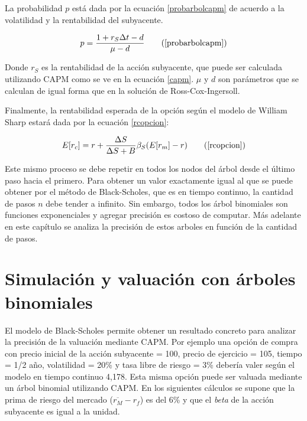 La probabilidad $p$ está dada por la ecuación \eqref{probarbolcapm} de acuerdo a la volatilidad y la rentabilidad del subyacente.

\begin{equation}
	p = \frac{1 + r_S \Delta t - d}{\mu - d} \tag{\ref{probarbolcapm}}
\end{equation}

Donde $r_S$ es la rentabilidad de la acción subyacente, que puede ser calculada utilizando CAPM como se ve en la ecuación \eqref{capm}. $\mu$ y $d$ son parámetros que se calculan de igual forma que en la solución de Ross-Cox-Ingersoll. 

Finalmente, la rentabilidad esperada de la opción según el modelo de William Sharp estará dada por la ecuación \eqref{rcopcion}:

\begin{equation}
	E[r_c] = r + \frac{\Delta S}{\Delta S + B} \beta_S (E[r_m] - r) \tag{\ref{rcopcion}}
\end{equation}
	
Este mismo proceso se debe repetir en todos los nodos del árbol desde el último paso hacia el primero. Para obtener un valor exactamente igual al que se puede obtener por el método de Black-Scholes, que es en tiempo continuo, la cantidad de pasos $n$ debe tender a infinito. Sin embargo, todos los árbol binomiales son funciones exponenciales y agregar precisión es costoso de computar. Más adelante en este capítulo se analiza la precisión de estos arboles en función de la cantidad de pasos.


\section{Simulación y valuación con árboles binomiales}

El modelo de Black-Scholes permite obtener un resultado concreto para analizar la precisión de la valuación mediante CAPM. Por ejemplo una opción de compra con precio inicial de la acción subyacente = 100, precio de ejercicio = 105, tiempo = 1/2 año, volatilidad = 20\% y tasa libre de riesgo = 3\% debería valer según el modelo en tiempo continuo 4,178. Esta misma opción puede ser valuada mediante un árbol binomial utilizando CAPM. En los siguientes cálculos se supone que la prima de riesgo del mercado ($\overline{r_M} - r_f$) es del 6\% y que el \textit{beta} de la acción subyacente es igual a la unidad.

